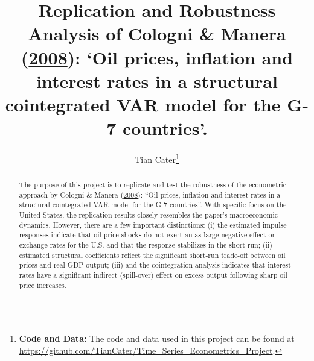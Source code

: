 \documentclass[11pt,preprint, authoryear]{elsarticle}
\numberwithin{equation}{section}
\numberwithin{figure}{section}
\numberwithin{table}{section}
\let\rmarkdownfootnote\footnote%
\def\footnote{\protect\rmarkdownfootnote}
\begin{document}
\begin{frontmatter}  %

\title{Replication and Robustness Analysis of Cologni \& Manera
(\protect\hyperlink{ref-cologni2008}{2008}): `Oil prices, inflation and
interest rates in a structural cointegrated VAR model for the G-7
countries'.}





\author[Add1]{Tian Cater\footnote{\textbf{Code and Data:} \newline The
  code and data used in this project can be found at
  \url{https://github.com/TianCater/Time_Series_Econometrics_Project}.}}





\address[Add1]{Econometrics 871: Time Series Research Project 2022}


\begin{abstract}
\small{
The purpose of this project is to replicate and test the robustness of
the econometric approach by Cologni \& Manera
(\protect\hyperlink{ref-cologni2008}{2008}): ``Oil prices, inflation and
interest rates in a structural cointegrated VAR model for the G-7
countries''. With specific focus on the United States, the replication
results closely resembles the paper's macroeconomic dynamics. However,
there are a few important distinctions: (i) the estimated impulse
responses indicate that oil price shocks do not exert an as large
negative effect on exchange rates for the U.S. and that the response
stabilizes in the short-run; (ii) estimated structural coefficients
reflect the significant short-run trade-off between oil prices and real
GDP output; (iii) and the cointegration analysis indicates that interest
rates have a significant indirect (spill-over) effect on excess output
following sharp oil price increases.
}
\end{abstract}

\vspace{1cm}





\vspace{0.5cm}

\end{frontmatter}



\pagestyle{fancy}
\chead{}
\rhead{}
\lfoot{}
\lhead{}
\cfoot{}
\end{document}
